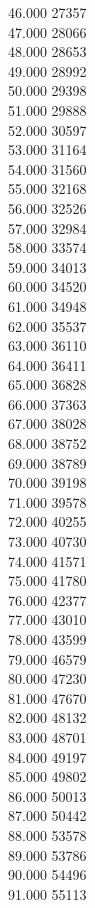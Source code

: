 { 46.000	27357 \\
 47.000	28066 \\
 48.000	28653 \\
 49.000	28992 \\
 50.000	29398 \\
 51.000	29888 \\
 52.000	30597 \\
 53.000	31164 \\
 54.000	31560 \\
 55.000	32168 \\
 56.000	32526 \\
 57.000	32984 \\
 58.000	33574 \\
 59.000	34013 \\
 60.000	34520 \\
 61.000	34948 \\
 62.000	35537 \\
 63.000	36110 \\
 64.000	36411 \\
 65.000	36828 \\
 66.000	37363 \\
 67.000	38028 \\
 68.000	38752 \\
 69.000	38789 \\
 70.000	39198 \\
 71.000	39578 \\
 72.000	40255 \\
 73.000	40730 \\
 74.000	41571 \\
 75.000	41780 \\
 76.000	42377 \\
 77.000	43010 \\
 78.000	43599 \\
 79.000	46579 \\
 80.000	47230 \\
 81.000	47670 \\
 82.000	48132 \\
 83.000	48701 \\
 84.000	49197 \\
 85.000	49802 \\
 86.000	50013 \\
 87.000	50442 \\
 88.000	53578 \\
 89.000	53786 \\
 90.000	54496 \\
 91.000	55113 \\
}
